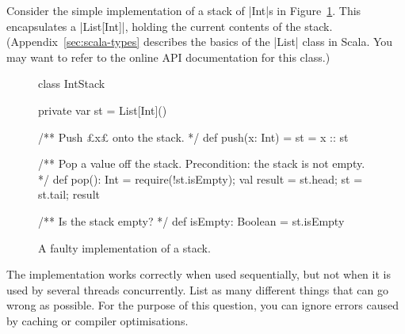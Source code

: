 \begin{questionS}
\label{exercise:stackRace}
Consider the simple implementation of a stack of |Int|s in
Figure~\ref{fig:stackRace}.  This encapsulates a |List[Int]|, holding the
current contents of the stack.  (Appendix~\ref{sec:scala-types} describes the
basics of the |List| class in Scala.  You may want to refer to the online API
documentation for this class.)


\begin{figure}
\begin{scala}
class IntStack{
  private var st = List[Int]()

  /** Push £x£ onto the stack. */
  def push(x: Int) = { st = x :: st }

  /** Pop a value off the stack.  Precondition: the stack is not empty. */
  def pop(): Int = {
    require(!st.isEmpty); val result = st.head; st = st.tail; result
  }

  /** Is the stack empty? */
  def isEmpty: Boolean = st.isEmpty
}
\end{scala}
\caption{A faulty implementation of a stack.}
\label{fig:stackRace}
\end{figure}






The implementation works correctly when used sequentially, but not when it is
used by several threads concurrently.  List as many different things that can
go wrong as possible.  For the purpose of this question, you can ignore errors
caused by caching or compiler optimisations.


\end{questionS}
